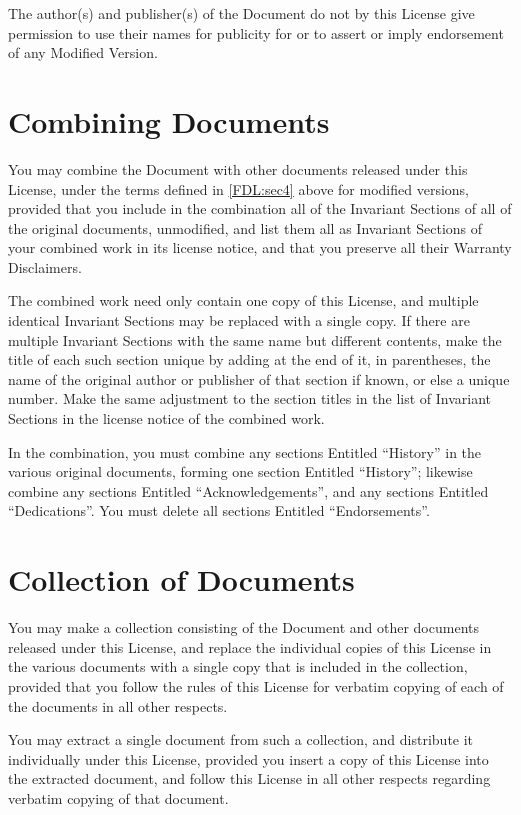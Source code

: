 \documentclass[12pt,a4paper,openany]{book}
\begin{document}
The author(s) and publisher(s) of the Document do not by this License give
permission to use their names for publicity for or to assert or imply
endorsement of any Modified Version.

\section{Combining Documents}
\label{FDL:sec5}

You may combine the Document with other documents released under this
License, under the terms defined in \autoref{FDL:sec4} above for modified
versions, provided that you include in the combination all of the Invariant
Sections of all of the original documents, unmodified, and list them all as
Invariant Sections of your combined work in its license notice, and that
you preserve all their Warranty Disclaimers.

The combined work need only contain one copy of this License, and multiple
identical Invariant Sections may be replaced with a single copy.  If there
are multiple Invariant Sections with the same name but different contents,
make the title of each such section unique by adding at the end of it, in
parentheses, the name of the original author or publisher of that section
if known, or else a unique number.  Make the same adjustment to the section
titles in the list of Invariant Sections in the license notice of the
combined work.

In the combination, you must combine any sections Entitled “History” in the
various original documents, forming one section Entitled “History”;
likewise combine any sections Entitled “Acknowledgements”, and any sections
Entitled “Dedications”.  You must delete all sections Entitled
“Endorsements”.

\section{Collection of Documents}
\label{FDL:sec6}

You may make a collection consisting of the Document and other documents
released under this License, and replace the individual copies of this
License in the various documents with a single copy that is included in
the collection, provided that you follow the rules of this License for
verbatim copying of each of the documents in all other respects.

You may extract a single document from such a collection, and distribute
it individually under this License, provided you insert a copy of this
License into the extracted document, and follow this License in all
other respects regarding verbatim copying of that document.
\end{document}
